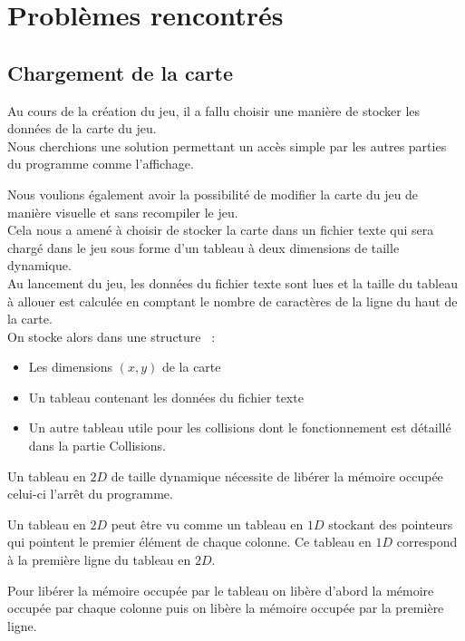 \documentclass[12pt]{article}
\begin{document}
	\section{Problèmes rencontrés}

		\subsection{Chargement de la carte}
		
			Au cours de la création du jeu, il a fallu choisir une manière de stocker les données de la carte du jeu.\\


			Nous cherchions une solution permettant un accès simple par les autres parties du programme comme l’affichage.
		
			Nous voulions également avoir la possibilité de modifier la carte du jeu de manière visuelle et sans recompiler le jeu.\\


			Cela nous a amené à choisir de stocker la carte dans un fichier texte qui sera chargé dans le jeu sous forme 
			d’un tableau à deux dimensions de taille dynamique.\\
		
			Au lancement du jeu, les données du fichier texte sont lues et la taille du tableau à allouer est calculée en 
			comptant le nombre de caractères de la ligne du haut de la carte.\\
		
			On stocke alors dans une structure  :
			\begin{itemize}
				\item Les dimensions \((x, y)\) de la carte
				\item Un tableau contenant les données du fichier texte
				\item Un autre tableau utile pour les collisions dont le fonctionnement est détaillé dans la partie Collisions.
			\end{itemize}
		
			Un tableau en \(2D\) de taille dynamique nécessite de libérer la mémoire occupée celui-ci l’arrêt du programme.
		
			Un tableau en \(2D\) peut être vu comme un tableau en \(1D\) stockant des pointeurs qui pointent le premier élément 
			de chaque colonne. Ce tableau en \(1D\) correspond à la première ligne du tableau en \(2D\).
		
			Pour libérer la mémoire occupée par le tableau on libère d’abord la mémoire occupée par chaque colonne puis 
			on libère la mémoire occupée par la première ligne.
		
\end{document}
